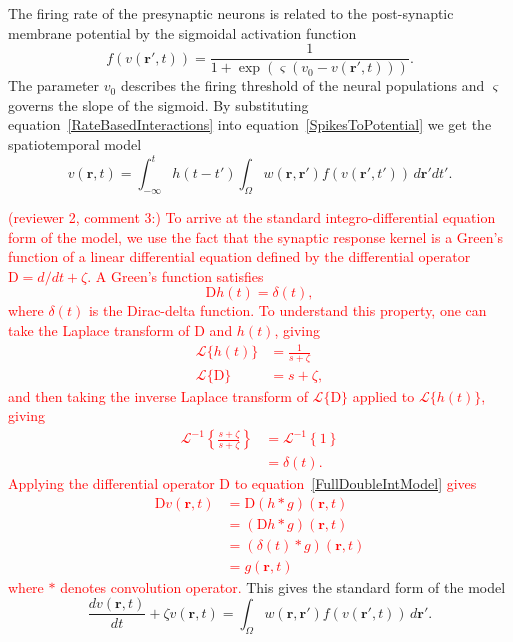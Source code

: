 \documentclass[review,authoryear,3p]{elsarticle}
\newcommand{\dean}[1]{\textcolor{red}{#1}}
\begin{document}
The firing rate of the presynaptic neurons is related to the post-synaptic membrane potential by the sigmoidal activation function 
\begin{equation}
	\label{ActivationFunction} f\left( v\left( \mathbf{r}', t \right) \right) = \frac{1}{1 + \exp \left( \varsigma \left( v_0 - v\left(\mathbf{r}',t\right) \right) \right)}. 
\end{equation}
The parameter $v_0$ describes the firing threshold of the neural populations and $\varsigma$ governs the slope of the sigmoid. By substituting equation~\ref{RateBasedInteractions} into equation~\ref{SpikesToPotential} we get the spatiotemporal model 
\begin{equation}
	\label{FullDoubleIntModel} v\left(\mathbf{r},t\right) =
	\int_{-\infty}^t 
	h\left(t - t'\right) \int_\Omega
	w\left(\mathbf{r},\mathbf{r}'\right) 
	f\left( v\left( \mathbf{r}',t' \right)\right)
	\, d\mathbf{r}'dt'.
\end{equation}

\dean{(reviewer 2, comment 3:) To arrive at the standard integro-differential equation form of the model, we use the fact that the synaptic response kernel is a Green's function of a linear differential equation defined by the differential operator $\textrm{D}=d/dt + \zeta$. A Green's function satisfies
\begin{equation}
	\label{GreensFuncDef} \textrm{D}h\left( t \right) = \delta \left( t \right), 
\end{equation} 
where $\delta(t)$ is the Dirac-delta function. To understand this property, one can take the Laplace transform of $\textrm{D}$ and $h(t)$, giving
\begin{align}
	\mathcal{L}\{h(t)\} &= \frac{1}{s+\zeta} \\
	\mathcal{L}\{\textrm{D}\} &= s+\zeta,
\end{align}
and then taking the inverse Laplace transform of $\mathcal{L}\{\textrm{D}\}$ applied to $\mathcal{L}\{h(t)\}$, giving
\begin{align}
	\mathcal{L}^{-1}\left\{\frac{s+\zeta}{s+\zeta}\right\} &= \mathcal{L}^{-1}\left\{1\right\} \\
	&= \delta \left( t \right).
\end{align}
Applying the differential operator $\textrm{D}$ to equation~\ref{FullDoubleIntModel} gives
\begin{align}
 \textrm{D}v\left(\mathbf r,t\right)&= \textrm{D}\left(h\ast g\right)\left(\mathbf r,t\right)\\
&=\left(\textrm{D}h\ast g\right)\left(\mathbf r,t\right)\\
&=\left(\delta \left(t\right)\ast g\right)\left(\mathbf r,t\right)\\
&=g\left(\mathbf r,t\right)
\end{align}
where $\ast$ denotes convolution operator.} This gives the standard form of the model
\begin{equation}
	\label{FinalFormContinuous} 
	\frac{dv\left( \mathbf{r},t \right)}{dt} + \zeta v\left( \mathbf{r},t \right) = \int_\Omega {w\left( \mathbf{r},\mathbf{r}' \right)f\left( {v\left( \mathbf{r}',t \right)} \right)\, d\mathbf{r}'}. 
\end{equation}
\end{document}

